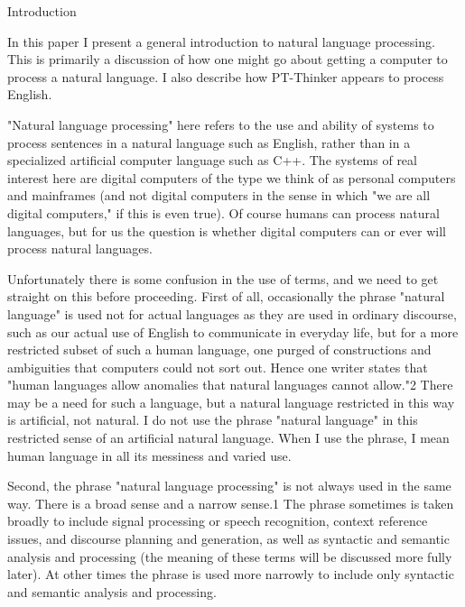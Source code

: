 
Introduction

In this paper I present a general introduction to natural language processing. This is primarily a discussion of how one might go about getting a computer to process a natural language. I also describe how PT-Thinker appears to process English.

"Natural language processing" here refers to the use and ability of systems to process sentences in a natural language such as English, rather than in a specialized artificial computer language such as C++. The systems of real interest here are digital computers of the type we think of as personal computers and mainframes (and not digital computers in the sense in which "we are all digital computers," if this is even true). Of course humans can process natural languages, but for us the question is whether digital computers can or ever will process natural languages.

Unfortunately there is some confusion in the use of terms, and we need to get straight on this before proceeding. First of all, occasionally the phrase "natural language" is used not for actual languages as they are used in ordinary discourse, such as our actual use of English to communicate in everyday life, but for a more restricted subset of such a human language, one purged of constructions and ambiguities that computers could not sort out. Hence one writer states that "human languages allow anomalies that natural languages cannot allow."2 There may be a need for such a language, but a natural language restricted in this way is artificial, not natural. I do not use the phrase "natural language" in this restricted sense of an artificial natural language. When I use the phrase, I mean human language in all its messiness and varied use.

Second, the phrase "natural language processing" is not always used in the same way. There is a broad sense and a narrow sense.1 The phrase sometimes is taken broadly to include signal processing or speech recognition, context reference issues, and discourse planning and generation, as well as syntactic and semantic analysis and processing (the meaning of these terms will be discussed more fully later). At other times the phrase is used more narrowly to include only syntactic and semantic analysis and processing.

